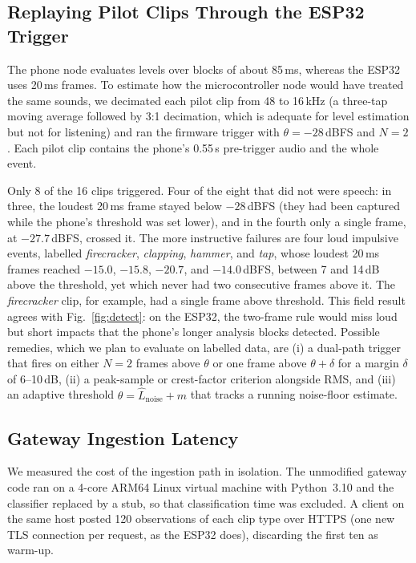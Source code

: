 \documentclass[conference]{IEEEtran}
\newcommand{\dBFS}{\,dBFS}
\newcommand{\ms}{\,ms}
\begin{document}
\subsection{Replaying Pilot Clips Through the ESP32 Trigger}
The phone node evaluates levels over blocks of about 85\ms, whereas the ESP32 uses 20\ms{} frames. To estimate how the microcontroller node would have treated the same sounds, we decimated each pilot clip from 48 to 16\,kHz (a three-tap moving average followed by 3:1 decimation, which is adequate for level estimation but not for listening) and ran the firmware trigger with $\theta = -28$\dBFS{} and $N=2$. Each pilot clip contains the phone's 0.55\,s pre-trigger audio and the whole event.

Only 8 of the 16 clips triggered. Four of the eight that did not were speech: in three, the loudest 20\ms{} frame stayed below $-28$\dBFS{} (they had been captured while the phone's threshold was set lower), and in the fourth only a single frame, at $-27.7$\dBFS, crossed it. The more instructive failures are four loud impulsive events, labelled \emph{firecracker}, \emph{clapping}, \emph{hammer}, and \emph{tap}, whose loudest 20\ms{} frames reached $-15.0$, $-15.8$, $-20.7$, and $-14.0$\dBFS, between 7 and 14\,dB above the threshold, yet which never had two consecutive frames above it. The \emph{firecracker} clip, for example, had a single frame above threshold. This field result agrees with Fig.~\ref{fig:detect}: on the ESP32, the two-frame rule would miss loud but short impacts that the phone's longer analysis blocks detected. Possible remedies, which we plan to evaluate on labelled data, are (i) a dual-path trigger that fires on either $N=2$ frames above $\theta$ or one frame above $\theta + \delta$ for a margin $\delta$ of 6--10\,dB, (ii) a peak-sample or crest-factor criterion alongside RMS, and (iii) an adaptive threshold $\theta = \hat{L}_{\text{noise}} + m$ that tracks a running noise-floor estimate.

\subsection{Gateway Ingestion Latency}
We measured the cost of the ingestion path in isolation. The unmodified gateway code ran on a 4-core ARM64 Linux virtual machine with Python~3.10 and the classifier replaced by a stub, so that classification time was excluded. A client on the same host posted 120 observations of each clip type over HTTPS (one new TLS connection per request, as the ESP32 does), discarding the first ten as warm-up.
\end{document}
